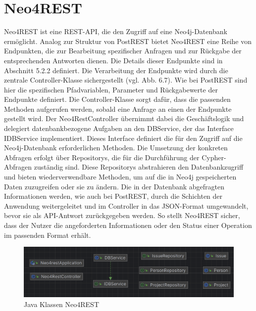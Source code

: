 \section{Neo4REST} %
\label{sec:neo4rest}
Neo4REST ist eine REST-API, die den Zugriff auf eine Neo4j-Datenbank ermöglicht. Analog zur Struktur von PostREST bietet Neo4REST eine Reihe von Endpunkten, die zur Bearbeitung spezifischer Anfragen und zur Rückgabe der entsprechenden Antworten dienen. Die Details dieser Endpunkte sind in Abschnitt 5.2.2 definiert.
\noindent 
Die Verarbeitung der Endpunkte wird durch die zentrale Controller-Klasse sichergestellt (vgl. Abb. 6.7). Wie bei PostREST sind hier die spezifischen Pfadvariablen, Parameter und Rückgabewerte der Endpunkte definiert. Die Controller-Klasse sorgt dafür, dass die passenden Methoden aufgerufen werden, sobald eine Anfrage an einen der Endpunkte gestellt wird.
\noindent 
Der Neo4RestController übernimmt dabei die Geschäftslogik und delegiert datenbankbezogene Aufgaben an den DBService, der das Interface IDBService implementiert. Dieses Interface definiert die für den Zugriff auf die Neo4j-Datenbank erforderlichen Methoden. Die Umsetzung der konkreten Abfragen erfolgt über Repositorys, die für die Durchführung der Cypher-Abfragen zuständig sind. Diese Repositorys abstrahieren den Datenbankzugriff und bieten wiederverwendbare Methoden, um auf die in Neo4j gespeicherten Daten zuzugreifen oder sie zu ändern.
\noindent 
Die in der Datenbank abgefragten Informationen werden, wie auch bei PostREST, durch die Schichten der Anwendung weitergeleitet und im Controller in das JSON-Format umgewandelt, bevor sie als API-Antwort zurückgegeben werden. So stellt Neo4REST sicher, dass der Nutzer die angeforderten Informationen oder den Status einer Operation im passenden Format erhält.
\begin{figure}[H]
	\centering
	\includegraphics[scale=0.5]{Illustrations/neo4rest.png}
	\caption{Java Klassen Neo4REST}
\end{figure}

